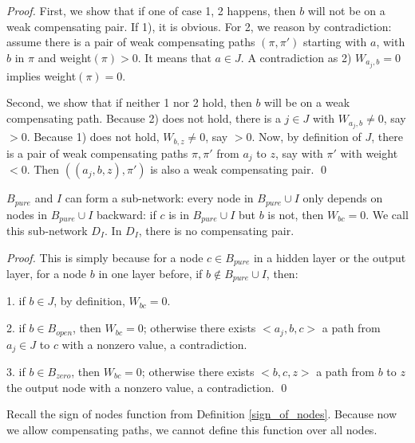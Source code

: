 				\begin{proof}
					First, we show that if one of case 1, 2 happens, then $b$ will not be on a weak compensating pair. If 1), it is obvious. For 2, we reason by contradiction: assume there is a pair of weak compensating paths 	$(\pi,\pi')$ starting with $a$, with $b$ in $\pi$ and weight$(\pi) > 0$. It means that $a \in J$. A contradiction as 2) $W_{a_j,b}=0$ implies weight$(\pi)=0$.
					
					Second, we show that if neither 1 nor 2 hold, then $b$ will be on a weak compensating path.
					Because 2) does not hold, there is a $j \in J$ with $W_{a_j,b} \neq 0$, say $>0$.
					Because 1) does not hold, $W_{b,z} \neq 0$, say $>0$.
					Now, by definition of $J$, there is a pair of weak compensating paths $\pi,\pi'$ 
					from $a_j$ to $z$, say with $\pi'$ with weight $<0$.
					Then $((a_j,b,z), \pi')$ is also a weak compensating pair. \qed
				\end{proof}
				
				\begin{lemma}\label{lem:subnetwork}
					$B_{pure}$ and $I$ can form a sub-network: every node in $B_{pure}\cup I$ only depends on nodes in $B_{pure}\cup I$ backward: if $c$ is in $B_{pure}\cup I$ but $b$ is not, then $W_{bc}=0$. We call this sub-network $D_I$. In $D_I$, there is no compensating pair.
				\end{lemma}
				
				\begin{proof}
					This is simply because for a node $c\in B_{pure}$ in a hidden layer or the output layer, for a node $b$ in one layer before, if $b\notin B_{pure}\cup I$, then:
					
					1. if $b\in J$, by definition, $W_{bc}=0$.
					
					2. if $b\in B_{open}$, then $W_{bc}=0$; otherwise there exists $<a_j,b,c>$ a path from $a_j\in J$ to $c$ with a nonzero value, a contradiction.
					
					3. if $b\in B_{zero}$, then $W_{bc}=0$; otherwise there exists $<b,c,z>$ a path from $b$ to $z$ the output node with a nonzero value, a contradiction. \qed
				\end{proof}
				
				
				
				Recall the sign of nodes function from Definition \ref{sign_of_nodes}. Because now we allow compensating paths, we cannot define this function over all nodes.
				
				
				
